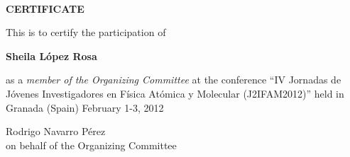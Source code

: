 \documentclass [13pt,a4paper] {letter}
\begin{document}
\pagestyle{empty} 
\begin{verbatim}







\end{verbatim}
\pagestyle{empty}
\begin{center}
{\bf {\Huge CERTIFICATE}}

\vspace {1.5cm}
This is to certify the participation of
\vspace {1cm}

{\bf \Large  Sheila    López Rosa  }
\vspace {1cm}

as a \emph{member of the Organizing Committee} at the conference { \textquotedblleft IV Jornadas de Jóvenes Investigadores en Física Atómica y Molecular (J2IFAM2012)\textquotedblright} 
held in Granada (Spain) February 1-3, 2012
\end{center}
\vspace {4cm}
\begin{raggedleft}
Rodrigo Navarro Pérez\\
on behalf of the Organizing Committee
\newpage
\end{raggedleft}
\end{document}
